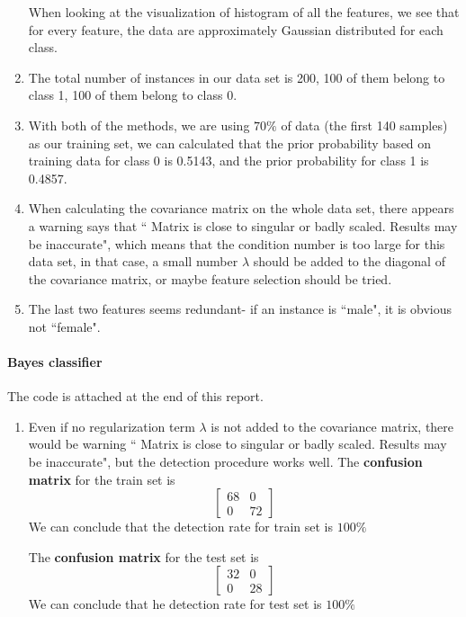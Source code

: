 \documentclass[a4paper]{article}
\begin{document}
\begin{spacing}{2.0}
\begin{enumerate}
When looking at the visualization of histogram of all the features, we see that for every feature, the data are approximately Gaussian distributed for each class.

\item The total number of instances in our data set is 200, 100 of them belong to class 1, 100 of them belong to class 0.

\item With both of the methods, we are using $70 \%$ of data (the first 140 samples) as our training set, we can calculated that the prior probability based on training data for class 0 is 0.5143, and the prior probability for class 1 is 0.4857.

\item When calculating the covariance matrix on the whole data set, there appears a warning says that `` Matrix is close to singular or badly scaled. Results may be inaccurate", which means that the condition number is too large for this data set, in that case, a small number $\lambda$ should be added to the diagonal of the covariance matrix, or maybe feature selection should be tried.

\item The last two features seems redundant- if an instance is ``male", it is obvious not ``female".\\

\end{enumerate}

\newpage
\paragraph{\huge\textbf{ Bayes classifier\\} }
\normalsize
The code is attached at the end of this report.\\
\begin{enumerate}
\item
Even if no regularization term $\lambda$ is not added to the covariance matrix, there would be warning `` Matrix is close to singular or badly scaled. Results may be inaccurate", but the detection procedure works well. The \textbf{confusion matrix} for the train set is 
$$\begin{bmatrix}
68 & 0 \\
0 & 72 
\end{bmatrix}$$
We can conclude that the detection rate for train set is $100\%$

The \textbf{confusion matrix} for the test set is 
$$\begin{bmatrix}
32 & 0 \\
0 & 28 
\end{bmatrix}$$
We can conclude that he detection rate for test set is $100\%$


\end{enumerate}
\end{spacing}
\end{document}
